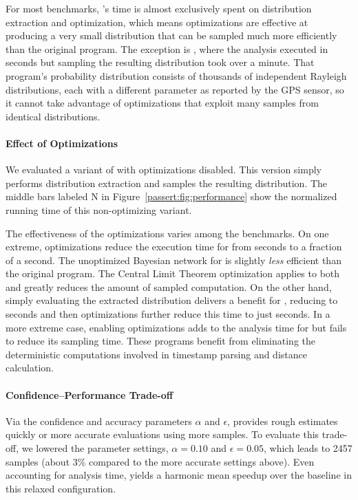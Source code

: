 For most benchmarks, \tool's time is almost exclusively spent on distribution
extraction and optimization, which means optimizations are effective at
producing a very small distribution that can be sampled much more efficiently
than the original program.
The exception is , where the analysis executed in
 seconds
but sampling the resulting distribution took over a minute.
That program's probability distribution consists of thousands of independent
Rayleigh distributions, each with a different parameter as reported by the GPS
sensor, so it cannot take advantage of optimizations that exploit many
samples from identical distributions.

\paragraph{Effect of Optimizations}
We evaluated a variant of \tool with optimizations disabled. This
version simply performs distribution extraction and samples the
resulting distribution.  The middle bars labeled N in
Figure~\ref{passert:fig:performance} show the normalized running time of this
non-optimizing \tool variant.

The effectiveness of the optimizations varies among the benchmarks.
On one extreme, optimizations
reduce the execution time for  from
 seconds to a fraction of a second.
The unoptimized Bayesian network for  is slightly
\emph{less} efficient than the original program.  The Central Limit
Theorem optimization applies to both and greatly reduces the amount of
sampled computation.  On the other hand, simply evaluating the
extracted distribution delivers a benefit for ,
reducing  to
 seconds and then optimizations
further reduce this time to just 
seconds.
In a more extreme case, enabling optimizations adds to the analysis time for
 but fails to reduce its sampling time.
These programs benefit from eliminating the deterministic
computations involved in timestamp parsing and distance calculation.

\paragraph{Confidence--Performance Trade-off}

Via the confidence and accuracy parameters $\alpha$ and $\epsilon$, \tool
provides rough estimates quickly or more accurate evaluations
using more samples.
To evaluate this trade-off, we lowered the
parameter settings, $\alpha = 0.10$ and $\epsilon = 0.05$, which leads to 2457
samples (about 3\% compared to the more accurate settings above).
Even accounting for analysis time, \tool yields a harmonic mean
speedup over the baseline in this relaxed configuration.
